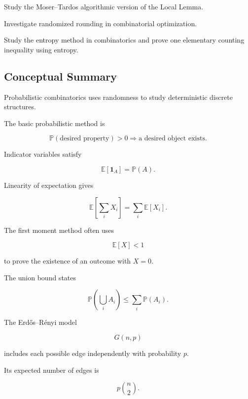 \begin{exercise}[4]
Study the Moser--Tardos algorithmic version of the Local Lemma.
\end{exercise}

\begin{exercise}[4]
Investigate randomized rounding in combinatorial optimization.
\end{exercise}

\begin{exercise}[4]
Study the entropy method in combinatorics and prove one elementary
counting inequality using entropy.
\end{exercise}

\subsection{Conceptual Summary}
\label{subsec:probabilistic-combinatorics-summary}

Probabilistic combinatorics uses randomness to study deterministic
discrete structures.

The basic probabilistic method is

\[
\boxed{
\mathbb{P}(\text{desired property})>0
\Longrightarrow
\text{a desired object exists}.
}
\]

Indicator variables satisfy

\[
\boxed{
\mathbb{E}[\mathbf{1}_A]
=
\mathbb{P}(A).
}
\]

Linearity of expectation gives

\[
\boxed{
\mathbb{E}
\left[
\sum_iX_i
\right]
=
\sum_i\mathbb{E}[X_i].
}
\]

The first moment method often uses

\[
\boxed{
\mathbb{E}[X]<1
}
\]

to prove the existence of an outcome with \(X=0\).

The union bound states

\[
\boxed{
\mathbb{P}
\left(
\bigcup_iA_i
\right)
\leq
\sum_i\mathbb{P}(A_i).
}
\]

The Erd\H{o}s--R\'enyi model

\[
\boxed{
G(n,p)
}
\]

includes each possible edge independently with probability \(p\).

Its expected number of edges is

\[
\boxed{
p\binom n2.
}
\]

